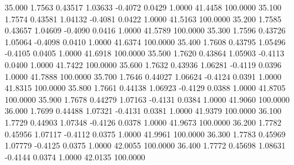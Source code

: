   35.000   1.7563   0.43517   1.03633  -0.4072   0.0429   1.0000  41.4458 100.0000
  35.100   1.7574   0.43581   1.04132  -0.4081   0.0422   1.0000  41.5163 100.0000
  35.200   1.7585   0.43657   1.04609  -0.4090   0.0416   1.0000  41.5789 100.0000
  35.300   1.7596   0.43726   1.05064  -0.4098   0.0410   1.0000  41.6374 100.0000
  35.400   1.7608   0.43795   1.05496  -0.4105   0.0405   1.0000  41.6918 100.0000
  35.500   1.7620   0.43864   1.05903  -0.4113   0.0400   1.0000  41.7422 100.0000
  35.600   1.7632   0.43936   1.06281  -0.4119   0.0396   1.0000  41.7888 100.0000
  35.700   1.7646   0.44027   1.06624  -0.4124   0.0391   1.0000  41.8315 100.0000
  35.800   1.7661   0.44138   1.06923  -0.4129   0.0388   1.0000  41.8705 100.0000
  35.900   1.7678   0.44279   1.07163  -0.4131   0.0384   1.0000  41.9060 100.0000
  36.000   1.7699   0.44488   1.07321  -0.4131   0.0381   1.0000  41.9379 100.0000
  36.100   1.7729   0.44903   1.07348  -0.4126   0.0378   1.0000  41.9673 100.0000
  36.200   1.7782   0.45956   1.07117  -0.4112   0.0375   1.0000  41.9961 100.0000
  36.300   1.7783   0.45969   1.07779  -0.4125   0.0375   1.0000  42.0055 100.0000
  36.400   1.7772   0.45698   1.08631  -0.4144   0.0374   1.0000  42.0135 100.0000
